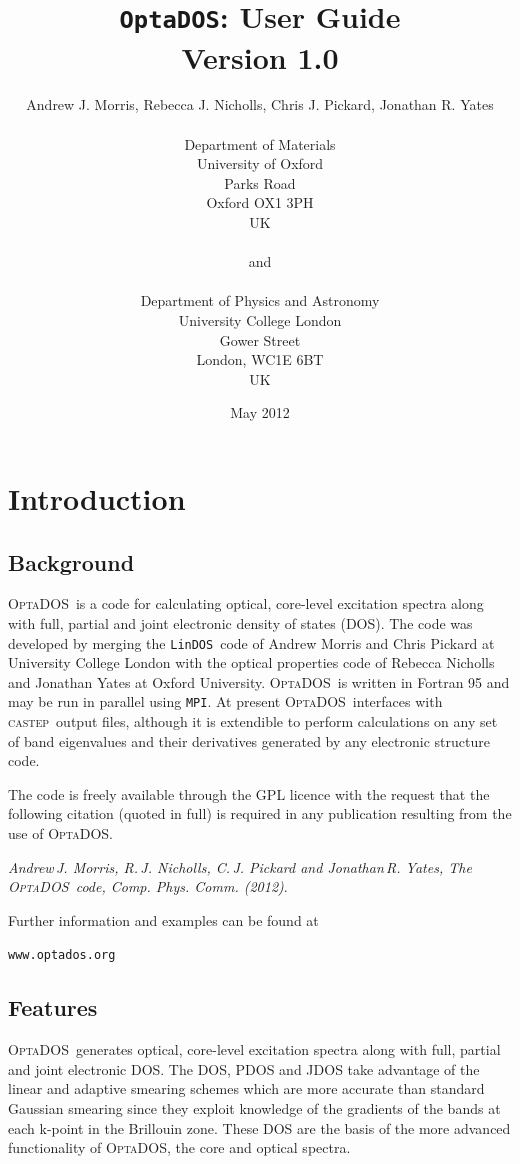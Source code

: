 \documentclass[a4paper,11pt,twoside]{book}
\title{{\huge {\tt OptaDOS}: User Guide}\\ {Version 1.0}}
\author{Andrew J. Morris, Rebecca J. Nicholls, Chris J. Pickard, Jonathan R. Yates \\
\\
Department of Materials\\
University of Oxford\\
Parks Road\\
Oxford OX1 3PH\\
UK \\
\\
{\small and} \\
\\
Department of Physics and Astronomy\\
University College London\\
Gower Street\\
London, WC1E 6BT\\
UK}
\date{May 2012}
\begin{document}
\newcommand{\optados}{\textsc{OptaDOS}}
\newcommand{\lindos}{\texttt{LinDOS}}
\newcommand{\castep}{\textsc{castep}}
\maketitle

\setcounter{tocdepth}{1}
\tableofcontents

\chapter{Introduction}\label{chap:introduction}
\section{Background}
\optados\ is a code for calculating optical, core-level excitation spectra along with full, partial and joint electronic density of states (DOS).  The code was developed by merging the \lindos\ code of Andrew Morris and Chris Pickard at University College London with the optical properties code of Rebecca Nicholls and Jonathan Yates at Oxford University.  \optados\ is written in Fortran 95 and may be run in parallel using {\tt MPI}.  At present \optados\ interfaces with \castep\ output files, although it is extendible to perform calculations on any set of band eigenvalues and their derivatives generated by any electronic structure code.

The code is freely available through the GPL licence with the request that the following citation (quoted in full) is required in any publication resulting from the use of \optados.

\emph{Andrew\,J. Morris, R.\,J. Nicholls, C.\,J. Pickard and Jonathan\,R. Yates, The \optados\ code, Comp. Phys. Comm. (2012)}.

\begin{center}
Further information and examples can be found at

\verb#www.optados.org#
\end{center}


\section{Features}
\optados\ generates optical, core-level excitation spectra along with full, partial and joint electronic DOS. The DOS, PDOS and JDOS take advantage of the linear and adaptive smearing schemes which are more accurate than standard Gaussian smearing since they exploit knowledge of the gradients of the bands at each k-point in the Brillouin zone.  These DOS are the basis of the more advanced functionality of \optados, the core and optical spectra.
\end{document}

